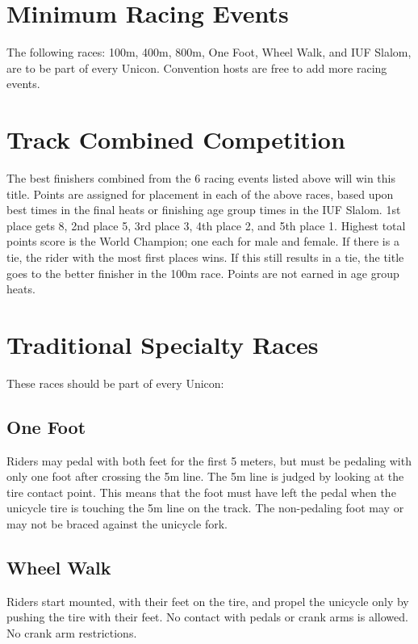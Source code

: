 \section{Minimum Racing Events \label{sec:track-field_minimum-racing-events}}
The following races: 100m, 400m, 800m, One Foot, Wheel Walk, and IUF Slalom, are to be part of every Unicon.
Convention hosts are free to add more racing events.

\section{Track Combined Competition}
The best finishers combined from the 6 racing events listed above will win this title.
Points are assigned for placement in each of the above races, based upon best times in the final heats or finishing age group times in the IUF Slalom.
1st place gets 8, 2nd place 5, 3rd place 3, 4th place 2, and 5th place 1.
Highest total points score is the World Champion; one each for male and female.
If there is a tie, the rider with the most first places wins.
If this still results in a tie, the title goes to the better finisher in the 100m race.
Points are not earned in age group heats.

\section{Traditional Specialty Races}
These races should be part of every Unicon:

\subsection{One Foot}
Riders may pedal with both feet for the first 5 meters, but must be pedaling with only one foot after crossing the 5m line.
The 5m line is judged by looking at the tire contact point.
This means that the foot must have left the pedal when the unicycle tire is touching the 5m line on the track.
The non-pedaling foot may or may not be braced against the unicycle fork.

\subsection{Wheel Walk}
Riders start mounted, with their feet on the tire, and propel the unicycle only by pushing the tire with their feet.
No contact with pedals or crank arms is allowed.
No crank arm restrictions.

